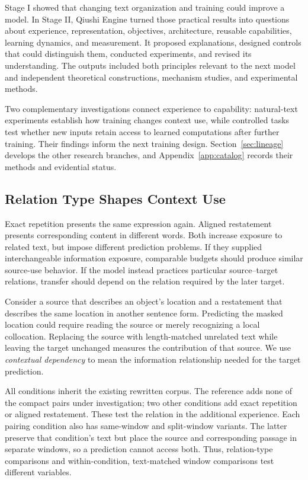 \label{sec:principles}

Stage I showed that changing text organization and training could improve a model. In Stage II, Qiushi Engine turned those practical results into questions about experience, representation, objectives, architecture, reusable capabilities, learning dynamics, and measurement. It proposed explanations, designed controls that could distinguish them, conducted experiments, and revised its understanding. The outputs included both principles relevant to the next model and independent theoretical constructions, mechanism studies, and experimental methods.

Two complementary investigations connect experience to capability: natural-text experiments establish how training changes context use, while controlled tasks test whether new inputs retain access to learned computations after further training. Their findings inform the next training design. Section~\ref{sec:lineage} develops the other research branches, and Appendix~\ref{app:catalog} records their methods and evidential status.

\subsection{Relation Type Shapes Context Use}
\label{sec:relation}

Exact repetition presents the same expression again. Aligned restatement presents corresponding content in different words. Both increase exposure to related text, but impose different prediction problems. If they supplied interchangeable information exposure, comparable budgets should produce similar source-use behavior. If the model instead practices particular source--target relations, transfer should depend on the relation required by the later target.

Consider a source that describes an object's location and a restatement that describes the same location in another sentence form. Predicting the masked location could require reading the source or merely recognizing a local collocation. Replacing the source with length-matched unrelated text while leaving the target unchanged measures the contribution of that source. We use \emph{contextual dependency} to mean the information relationship needed for the target prediction.

All conditions inherit the existing rewritten corpus. The reference adds none of the compact pairs under investigation; two other conditions add exact repetition or aligned restatement. These test the relation in the additional experience. Each pairing condition also has same-window and split-window variants. The latter preserve that condition's text but place the source and corresponding passage in separate windows, so a prediction cannot access both. Thus, relation-type comparisons and within-condition, text-matched window comparisons test different variables.

